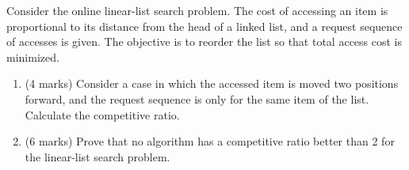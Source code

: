 \documentclass[11pt,a4paper]{article}
\begin{document}
\begin{qaquestion}
Consider the online linear-list search problem. The cost of accessing an item is proportional to its distance from the head of a linked list, and a request sequence of accesses is given. The objective is to reorder the list so that total access cost is minimized.

\begin{enumerate}[label=(\roman*),leftmargin=2em]
\item (4 marks) Consider a case in which the accessed item is moved two positions forward, and the request sequence is only for the same item of the list. Calculate the competitive ratio.
\item (6 marks) Prove that no algorithm has a competitive ratio better than 2 for the linear-list search problem.
\end{enumerate}
\end{qaquestion}
\end{document}
